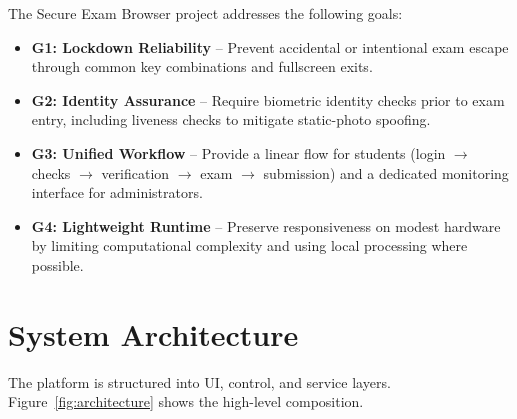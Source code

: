 \documentclass[conference]{IEEEtran}
\begin{document}
The Secure Exam Browser project addresses the following goals:
\begin{itemize}
\item \textbf{G1: Lockdown Reliability} -- Prevent accidental or intentional exam escape through common key combinations and fullscreen exits.
\item \textbf{G2: Identity Assurance} -- Require biometric identity checks prior to exam entry, including liveness checks to mitigate static-photo spoofing.
\item \textbf{G3: Unified Workflow} -- Provide a linear flow for students (login $\rightarrow$ checks $\rightarrow$ verification $\rightarrow$ exam $\rightarrow$ submission) and a dedicated monitoring interface for administrators.
\item \textbf{G4: Lightweight Runtime} -- Preserve responsiveness on modest hardware by limiting computational complexity and using local processing where possible.
\end{itemize}

\section{System Architecture}
The platform is structured into UI, control, and service layers. Figure~\ref{fig:architecture} shows the high-level composition.
\end{document}
